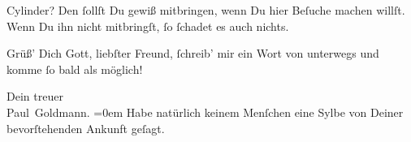 \pstart
           Cylinder? Den{ }ſollſt Du gewiß mitbringen, wenn Du hier Beſuche machen willſt. Wenn
                  {\pb}Du ihn nicht mitbringſt,{ }ſo{ }ſchadet es auch
               nichts.\pend
           
\pstart
           Grüß’ Dich Gott, liebſter Freund,{ }ſchreib’ mir ein Wort \strikeout{\textcolor{gray}{×}} von unterwegs und komme{ }ſo bald als möglich!\pend
           
\pstart
           Dein treuer {\\[\baselineskip]}\spacefill\mbox{Paul Goldmann.}\pend
           \leftskip=0em{}
\pstart
           \noindent{}Habe natürlich keinem Menſchen eine Sylbe von Deiner bevorſtehenden Ankunft
                  geſagt.\pend
           \endnumbering{}  \newcommand{\dateiname}{L02807}\newcommand{\titel}{Paul Goldmann an Arthur Schnitzler, 4. 4. [1897]}\newcommand{\editorInnen}{Martin Anton Müller und Laura Untner}
